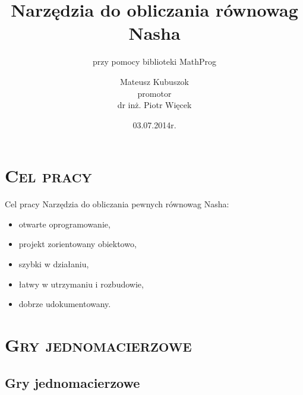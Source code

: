 \documentclass[xcolor=x11names,compress]{beamer}
\renewcommand{\(}{\begin{columns}}
\renewcommand{\)}{\end{columns}}
\newcommand{\<}[1]{\begin{column}{#1}}
\renewcommand{\>}{\end{column}}
\begin{document}
\begin{frame}
\title{Narzędzia do obliczania równowag Nasha}
\subtitle{przy pomocy biblioteki MathProg}
\author[M. Kubuszok]{
  Mateusz Kubuszok\\
  \bigskip
  \tiny{promotor}\\
  \scriptsize{dr inż. Piotr Więcek}\\
}
\date[Lipiec 2014]{\tiny{03.07.2014r.}}
\titlepage
\end{frame}


\section{\scshape Cel pracy}

\begin{frame}{Cel pracy}
Narzędzia do obliczania pewnych równowag Nasha:
\begin{itemize}
\item otwarte oprogramowanie,
\item projekt zorientowany obiektowo,
\item szybki w działaniu,
\item łatwy w utrzymaniu i rozbudowie,
\item dobrze udokumentowany.
\end{itemize}
\end{frame}


\section{\scshape Gry jednomacierzowe}
\subsection{Gry jednomacierzowe}
\end{document}
